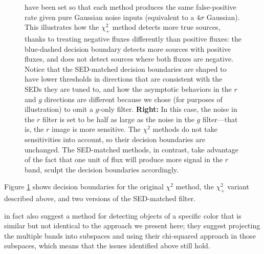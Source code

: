 \documentclass[11pt,letterpaper,linenumbers]{aastex63}
\newcommand{\chipos}{\chi_+}
\begin{document}
\begin{figure}
{    have been set so that each method produces the same false-positive
    rate given pure Gaussian noise inputs (equivalent to a $4 \sigma$
    Gaussian).  This illustrates how the $\chipos^2$ method detects
    more true sources, thanks to treating negative fluxes differently
    than positive fluxes: the blue-dashed decision boundary detects
    more sources with positive fluxes, and does not detect sources
    where both fluxes are negative.  Notice that the SED-matched
    decision boundaries are shaped to have lower thresholds in
    directions that are consistent with the SEDs they are tuned to,
    and how the asymptotic behaviors in the $r$ and $g$ directions are
    different because we chose (for purposes of illustration) to omit
    a $g$-only filter.  \textbf{Right:} In this case, the noise in the
    $r$ filter is set to be half as large as the noise in the $g$
    filter---that is, the $r$ image is more sensitive.  The $\chi^2$
    methods do not take sensitivities into account, so their decision
    boundaries are unchanged.  The SED-matched methods, in contrast,
    take advantage of the fact that one unit of flux will produce more
    signal in the $r$ band, sculpt the decision boundaries
    accordingly.
  \label{fig:chipos_boundary}}
\end{figure}

Figure \ref{fig:chipos_boundary} shows decision boundaries for the
original $\chi^2$ method, the $\chipos^2$ variant described above, and
two versions of the SED-matched filter.







\cite{szalay1999} in fact also suggest a method for detecting objects
of a specific color that is similar but not identical to the approach
we present here; they suggest projecting the multiple bands into
subspaces and using their chi-squared approach in those subspaces,
which means that the issues identified above still hold.
\end{document}
